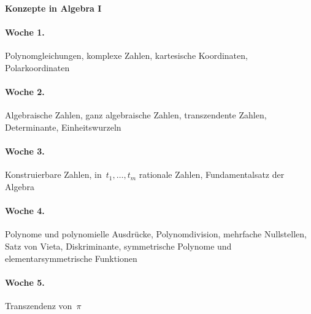 \documentclass{../algblatt}
\begin{document}
\begin{center}\huge \textsf{\textbf{Konzepte in Algebra I}}\end{center}
\vspace{1em}


\paragraph{Woche 1.} Polynomgleichungen, komplexe Zahlen, kartesische
Koordinaten, Polarkoordinaten

\paragraph{Woche 2.} Algebraische Zahlen, ganz algebraische Zahlen,
transzendente Zahlen, Determinante, Einheitswurzeln

\paragraph{Woche 3.} Konstruierbare Zahlen, in~$t_1,\ldots,t_m$ rationale
Zahlen, Fundamentalsatz der Algebra

\paragraph{Woche 4.} Polynome und polynomielle Ausdrücke, Polynomdivision,
mehrfache Nullstellen, Satz von Vieta, Diskriminante, symmetrische Polynome und
elementarsymmetrische Funktionen

\paragraph{Woche 5.} Transzendenz von~$\pi$

\end{document}
